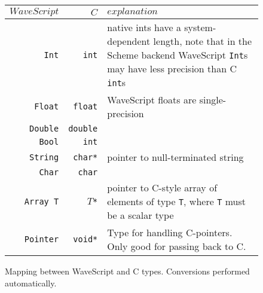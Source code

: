 \begin{figure}
\begin{center}
\begin{tabular}{|r|r|l|}
\hline
$WaveScript$ & $C$ & $explanation$\\
\hline
{\tt Int}   & {\tt int}   & 
  \parbox[t]{2.2in}{native ints have a system-dependent 
length, note that in the Scheme backend WaveScript {\tt Int}s may 
have less precision than C {\tt int}s} \\

{\tt Float} & {\tt float} & 
\parbox[t]{2.2in}{WaveScript floats are single-precision}\\

{\tt Double} & {\tt double} & \\

{\tt Bool} &   {\tt int} & \\

{\tt String} & {\tt char*} & pointer to null-terminated string \\


{\tt Char} & {\tt char} &  \\

{\tt Array T} & {\tt $T$*} & \parbox[t]{2.2in}{
pointer to C-style array of elements of type {\tt T}, where {\tt T}
must be a scalar type
}\\

{\tt Pointer} & {\tt void*} &  \parbox[t]{2.2in}{
 Type for handling C-pointers.  Only good for
  passing back to C.
}\\

\hline
\end{tabular}
\end{center}
\caption{Mapping between WaveScript and C types.  Conversions
  performed automatically.}
\label{f:types}
\end{figure}



